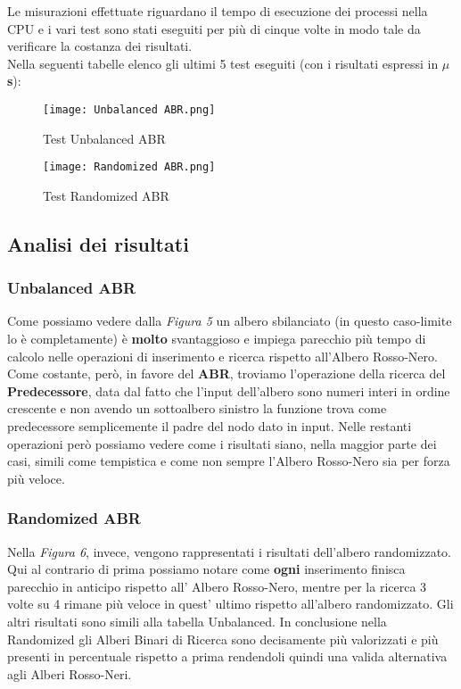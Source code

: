 \documentclass{article}
\begin{document}
Le misurazioni effettuate riguardano il tempo di esecuzione dei processi nella CPU e i vari test sono stati eseguiti per più di cinque volte in modo tale da verificare la costanza dei risultati.\\
Nella seguenti tabelle elenco gli ultimi 5 test eseguiti (con i risultati espressi in \textbf{$\mu$s}):
\begin{figure}[!hb]
        \centering
        \texttt{[image: Unbalanced ABR.png]}
        \caption{Test Unbalanced ABR}
        \label{fig:Unbalanced_ABR}
\end{figure}

\clearpage

\begin{figure}[!hb]
        \centering
        \texttt{[image: Randomized ABR.png]}
        \caption{Test Randomized ABR}
        \label{fig:Randomized_ABR}
\end{figure}

\subsection{Analisi dei risultati}
\subsubsection{Unbalanced ABR}
Come possiamo vedere dalla \textit{Figura 5} un albero sbilanciato (in questo caso-limite lo è completamente) è \textbf{molto} svantaggioso e impiega parecchio più tempo di calcolo nelle operazioni di inserimento e ricerca rispetto all'Albero Rosso-Nero.
Come costante, però, in favore del \textbf{ABR}, troviamo l'operazione della ricerca del \textbf{Predecessore}, data dal fatto che l'input dell'albero sono numeri interi in ordine crescente e non avendo un sottoalbero sinistro la funzione trova come predecessore semplicemente il padre del nodo dato in input.
Nelle restanti operazioni però possiamo vedere come i risultati siano, nella maggior parte dei casi, simili come tempistica e come non sempre l'Albero Rosso-Nero sia per forza più veloce.
\\
\subsubsection{Randomized ABR}
Nella \textit{Figura 6}, invece, vengono rappresentati i risultati dell'albero randomizzato.
Qui al contrario di prima possiamo notare come \textbf{ogni} inserimento finisca parecchio in anticipo rispetto all' Albero Rosso-Nero, mentre per la ricerca 3 volte su 4 rimane più veloce in quest' ultimo rispetto all'albero randomizzato.
Gli altri risultati sono simili alla tabella Unbalanced.
In conclusione nella Randomized gli Alberi Binari di Ricerca sono decisamente più valorizzati e più presenti in percentuale rispetto a prima rendendoli quindi una valida alternativa agli Alberi Rosso-Neri.
\end{document}
